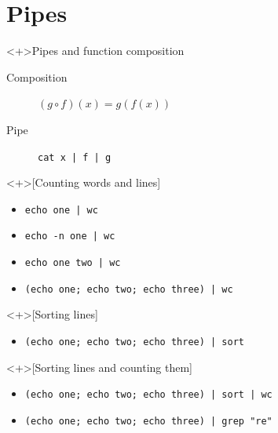 \section{Pipes}

\begin{frame}[fragile]
  \begin{block}<+>{Pipes and function composition}
    \begin{description}
      \item[Composition] \(
          (g \circ f)(x) = g(f(x))
        \)
      \item[Pipe] \lstinline{cat x | f | g}
    \end{description}
  \end{block}

  \begin{example}<+>[Counting words and lines]
    \begin{itemize}
      \item \lstinline{echo one | wc}
      \item \lstinline{echo -n one | wc}
      \item \lstinline{echo one two | wc}
      \item \lstinline{(echo one; echo two; echo three) | wc}
    \end{itemize}
  \end{example}
\end{frame}

\begin{frame}[fragile]
  \begin{example}<+>[Sorting lines]
    \begin{itemize}
      \item \lstinline{(echo one; echo two; echo three) | sort}
    \end{itemize}
  \end{example}

  \begin{example}<+>[Sorting lines and counting them]
    \begin{itemize}
      \item \lstinline{(echo one; echo two; echo three) | sort | wc}
    \end{itemize}
  \end{example}
\end{frame}

\begin{frame}[fragile]
  \begin{example}
    \begin{itemize}
      \item \lstinline{(echo one; echo two; echo three) | grep "re"}
    \end{itemize}
  \end{example}
\end{frame}


